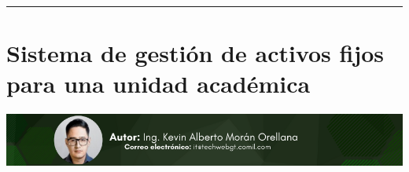 \documentclass[12pt,spanish,Letterpaper,openany]{book}
\newcommand{\HRule}{\begin{center}\rule{0.5\linewidth}{0.2mm}\end{center}}
\begin{document}
\medskip

\HRule

\medskip

\hypertarget{article07}{%
\chapter{Sistema de gestión de activos fijos para una unidad académica}\label{article07}}

\begin{center}\includegraphics[width=1\linewidth]{images/kevin} \end{center}
\end{document}
